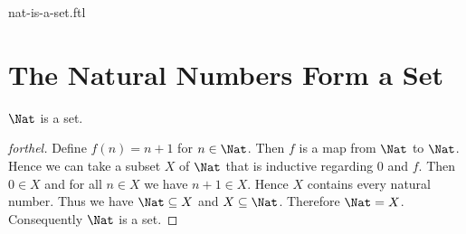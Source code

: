 \documentclass{naproche-library}
\begin{document}
\begin{smodule}{nat-is-a-set.ftl}

  \section*{The Natural Numbers Form a Set}

  \begin{proposition}[forthel,id=ARITHMETIC_07_4685510236547454]
    $\Nat$ is a set.
  \end{proposition}
  \begin{proof}[forthel]
    Define $f(n) = n + 1$ for $n \in \Nat$.
    Then $f$ is a map from $\Nat$ to $\Nat$.
    Hence we can take a subset $X$ of $\Nat$ that is inductive regarding
    $0$ and $f$.
    Then $0 \in X$ and for all $n \in X$ we have $n + 1 \in X$.
    Hence $X$ contains every natural number.
    Thus we have $\Nat \subseteq X$ and $X \subseteq \Nat$.
    Therefore $\Nat = X$.
    Consequently $\Nat$ is a set.
  \end{proof}
\end{smodule}
\end{document}
